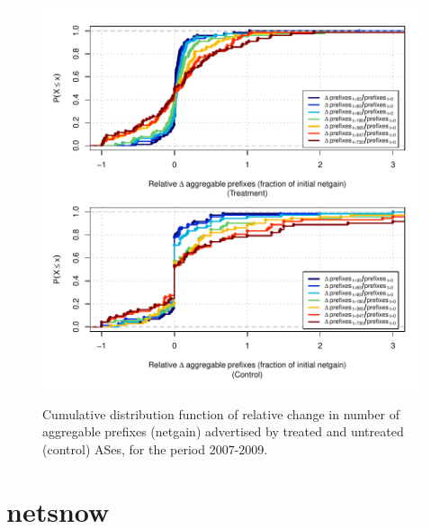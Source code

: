 \clearpage
\vspace*{1.25em}
\begin{figure}[H]
\begin{centering}
\begin{singlespace}
\captionsetup{list=no}
    \includegraphics[width=6in]{figures/behavior-rel_netgain-2007_2009-corr.pdf}
    \vspace{-2em}\\
    \caption{Cumulative distribution function of relative change in number of
    aggregable prefixes (netgain) advertised by treated and untreated (control)
    ASes, for the period 2007-2009.}
\end{singlespace}
\end{centering}
\end{figure}


\clearpage
\section{netsnow}

